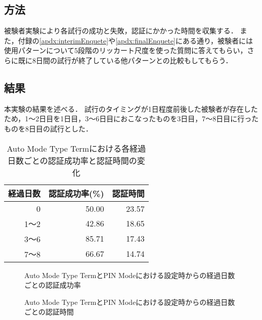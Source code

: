\subsection{方法}
被験者実験により各試行の成功と失敗，認証にかかった時間を収集する．
また，付録の\ref{apdx:interimEnquete}や\ref{apdx:finalEnquete}にある通り，被験者には使用パターンについて5段階のリッカート尺度を使った質問に答えてもらい，さらに既に8日間の試行が終了している他パターンとの比較もしてもらう．

\subsection{結果}
本実験の結果を述べる．
試行のタイミングが1日程度前後した被験者が存在したため，1〜2日目を1日目，3〜6日目におこなったものを3日目，7〜8日目に行ったものを8日目の試行とした．
\begin{table}[ht]
  \begin{center}
    \small
    \begin{tabular}{|r|r|r|} \hline
      経過日数 & 認証成功率(\%) & 認証時間\\ \hline
      0 & 50.00 & 23.57 \\
      1〜2 & 42.86 & 18.65 \\
      3〜6 & 85.71 & 17.43 \\
      7〜8 & 66.67 & 14.74 \\ \hline
    \end{tabular}
  \end{center}
  \caption{Auto Mode Type Termにおける各経過日数ごとの認証成功率と認証時間の変化}
  \label{tab:auto_term.data}
\end{table}

\begin{figure}[ht]
  \begin{center}
  \end{center}
  \caption{Auto Mode Type TermとPIN Modeにおける設定時からの経過日数ごとの認証成功率}
  \label{fig:ex_auto_term_vs_pin_rate}
\end{figure}

\begin{figure}[ht]
  \begin{center}
  \end{center}
  \caption{Auto Mode Type TermとPIN Modeにおける設定時からの経過日数ごとの認証時間}
  \label{fig:ex_auto_term_vs_pin_time}
\end{figure}

